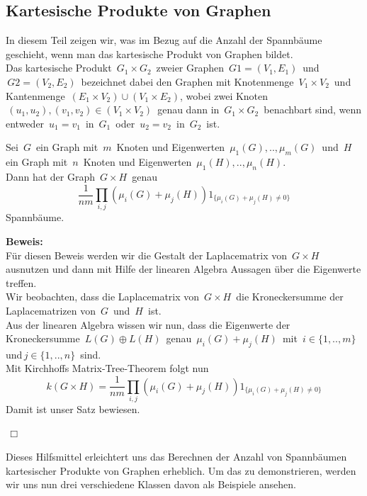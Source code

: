 \subsection{Kartesische Produkte von Graphen}
In diesem Teil zeigen wir, was im Bezug auf die Anzahl der Spannbäume geschieht, wenn man das kartesische Produkt von Graphen bildet.\\
Das kartesische Produkt $\,G_1\times G_2\,$ zweier Graphen $\,G1=(V_1,E_1)\,$ und $\,G2=(V_2,E_2)\,$ bezeichnet dabei den Graphen mit Knotenmenge $\,V_1\times V_2\,$ und Kantenmenge $\,(E_1\times V_2)\cup(V_1\times E_2)$,\; wobei zwei Knoten $\,(u_1,u_2), (v_1,v_2) \in (V_1\times V_2)\,$ genau dann in $\,G_1\times G_2\,$ benachbart sind, wenn entweder $\,u_1=v_1\,$ in $\,G_1\,$ oder $\,u_2=v_2\,$ in $\,G_2\,$ ist.\\
\begin{Tms}
 Sei $\,G\,$ ein Graph mit $\,m\,$ Knoten und Eigenwerten $\,\mu_1(G),..,\mu_m(G)\,$ und $\,H\,$ ein Graph mit $\,n\,$ Knoten und Eigenwerten $\,\mu_1(H),..,\mu_n(H)$.\;  \\
Dann hat der Graph $\,G \times H\,$ genau
\begin{equation*}
\frac{1}{nm}\displaystyle\prod_{i,j}(\mu_i(G)+\mu_j(H))1_{\{\mu_i(G)+\mu_j(H)\neq0\}}
\end{equation*}
Spannbäume.
\label{tmcpG}
\end{Tms}
\textbf{Beweis:}\\
Für diesen Beweis werden wir die Gestalt der Laplacematrix von $\,G \times H\,$ ausnutzen und dann mit Hilfe der linearen Algebra Aussagen über die Eigenwerte treffen.\\
Wir beobachten, dass die Laplacematrix von $\,G\times H\,$ die Kroneckersumme der Laplacematrizen von $\,G\,$ und $\,H\,$ ist.\\
Aus der linearen Algebra wissen wir nun, dass die Eigenwerte der Kroneckersumme $\,L(G) \oplus L(H)\,$ genau $\,\mu_i(G)+\mu_j(H)\,$ mit $\,i \in \{ 1,..,m\}\,$ und$\, j \in \{ 1,..,n\}\,$ sind.\\
Mit Kirchhoffs Matrix-Tree-Theorem folgt nun
\begin{equation*}
 \mathit{k}(G \times H) = \frac{1}{nm}\displaystyle\prod_{i,j}(\mu_i(G)+\mu_j(H))1_{\{\mu_i(G)+\mu_j(H)\neq0\}}
\end{equation*}
Damit ist unser Satz bewiesen.
\begin{flushright} $\,\Box\,$ \end{flushright} 
Dieses Hilfsmittel erleichtert uns das Berechnen der Anzahl von Spannbäumen kartesischer Produkte von Graphen erheblich. Um das zu demonstrieren, werden wir uns nun drei verschiedene Klassen davon als Beispiele ansehen.

